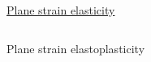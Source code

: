 \begin{frame}{\href{section4/animation/elasticity_stress/video.mp4}{Plane strain elasticity}}
  \begin{overprint}
    \vspace{-1.cm}
    \begin{columns}
      \begin{column}{0.42\linewidth}
        
      \end{column}

      \begin{column}{0.6\linewidth}
        \vspace{1.5cm}
        \centering
        \phantom{}
      \end{column}
      
    \end{columns}
    \vspace{-1.cm}
    \begin{columns}
      \begin{column}{0.42\linewidth}
      \end{column}

      \begin{column}{0.6\linewidth}
        \vspace{1.5cm}
        \centering
        
      \end{column}
    \end{columns}
  \end{overprint}
\end{frame}


\begin{frame}{Plane strain elastoplasticity}
  \begin{overprint}
    \vspace{0.25cm}
    \centering
    \centering
    
  \end{overprint}

\end{frame}
